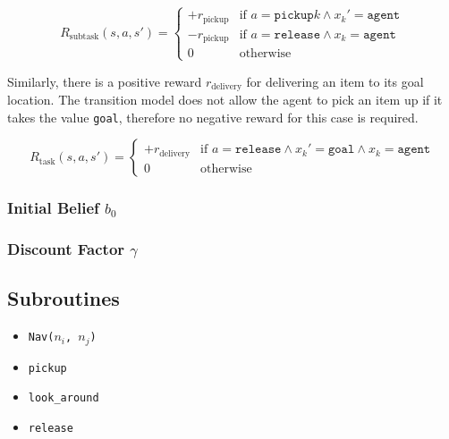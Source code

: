 \begin{equation}
    R_\text{subtask}(s,a,s') = \begin{cases}
    +r_\text{pickup} & \text{if }a=\texttt{pickup}k \land x_k'=\texttt{agent}\\
    -r_\text{pickup} & \text{if }a=\texttt{release}\land x_k=\texttt{agent}\\
    0 & \text{otherwise}\end{cases}
\end{equation}

Similarly, there is a positive reward $r_\text{delivery}$ for delivering an item to its goal location. The transition model does not allow the agent to pick an item up if it takes the value \texttt{goal}, therefore no negative reward for this case is required. 

\begin{equation}
    R_\text{task}(s,a,s') = \begin{cases} + r_\text{delivery} & \text{if }a=\texttt{release}\land x_k'=\texttt{goal}\land x_k=\texttt{agent}\\
    0 & \text{otherwise}
    \end{cases}
\end{equation}


\subsubsection{Initial Belief $b_0$}
\subsubsection{Discount Factor $\gamma$}


\subsection{Subroutines}\label{subsec:subroutine}
\begin{itemize}
    \item \texttt{Nav($n_i$, $n_j$)}
    \item \texttt{pickup}
    \item \texttt{look\_around}
    \item \texttt{release}
\end{itemize}
